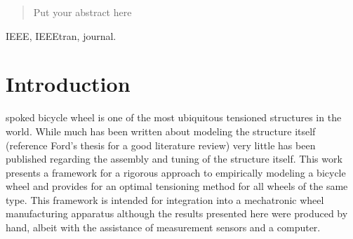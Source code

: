 \documentclass[journal]{IEEEtran}
\begin{document}




\maketitle

\begin{abstract}
Put your abstract here
\end{abstract}

\begin{IEEEkeywords}
IEEE, IEEEtran, journal.
\end{IEEEkeywords}

%
\IEEEpeerreviewmaketitle



\section{Introduction}
 spoked bicycle wheel is one of the most ubiquitous tensioned structures in the world. While much has been written about modeling the structure itself (reference Ford's thesis for a good literature review) very little has been published regarding the assembly and tuning of the structure itself.  This work presents a framework for a rigorous approach to empirically modeling a bicycle wheel and provides for an optimal tensioning method for all wheels of the same type.  This framework is intended for integration into a mechatronic wheel manufacturing apparatus although the results presented here were produced by hand, albeit with the assistance of measurement sensors and a computer. 
\end{document}
